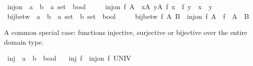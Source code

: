 \begin{isabellebody}
%
\isadelimdocument
%
\endisadelimdocument
%
\isatagdocument
%
\isamarkuptrue%
%
\endisatagdocument
{\isafolddocument}%
%
\isadelimdocument
%
\endisadelimdocument
{}\isamarkupfalse%
\ inj{\isacharunderscore}{\kern0pt}on\ {\isacharcolon}{\kern0pt}{\isacharcolon}{\kern0pt}\ {\isachardoublequoteopen}{\isacharparenleft}{\kern0pt}{\isacharprime}{\kern0pt}a\ {\isasymRightarrow}\ {\isacharprime}{\kern0pt}b{\isacharparenright}{\kern0pt}\ {\isasymRightarrow}\ {\isacharprime}{\kern0pt}a\ set\ {\isasymRightarrow}\ bool{\isachardoublequoteclose}\ \ %
\isanewline
\ \ \ {\isachardoublequoteopen}inj{\isacharunderscore}{\kern0pt}on\ f\ A\ {\isasymlongleftrightarrow}\ {\isacharparenleft}{\kern0pt}{\isasymforall}x{\isasymin}A{\isachardot}{\kern0pt}\ {\isasymforall}y{\isasymin}A{\isachardot}{\kern0pt}\ f\ x\ {\isacharequal}{\kern0pt}\ f\ y\ {\isasymlongrightarrow}\ x\ {\isacharequal}{\kern0pt}\ y{\isacharparenright}{\kern0pt}{\isachardoublequoteclose}\isanewline
\isanewline
{}\isamarkupfalse%
\ bij{\isacharunderscore}{\kern0pt}betw\ {\isacharcolon}{\kern0pt}{\isacharcolon}{\kern0pt}\ {\isachardoublequoteopen}{\isacharparenleft}{\kern0pt}{\isacharprime}{\kern0pt}a\ {\isasymRightarrow}\ {\isacharprime}{\kern0pt}b{\isacharparenright}{\kern0pt}\ {\isasymRightarrow}\ {\isacharprime}{\kern0pt}a\ set\ {\isasymRightarrow}\ {\isacharprime}{\kern0pt}b\ set\ {\isasymRightarrow}\ bool{\isachardoublequoteclose}\ \ %
\isanewline
\ \ \ {\isachardoublequoteopen}bij{\isacharunderscore}{\kern0pt}betw\ f\ A\ B\ {\isasymlongleftrightarrow}\ inj{\isacharunderscore}{\kern0pt}on\ f\ A\ {\isasymand}\ f\ {\isacharbackquote}{\kern0pt}\ A\ {\isacharequal}{\kern0pt}\ B{\isachardoublequoteclose}%
\begin{isamarkuptext}%
A common special case: functions injective, surjective or bijective over
  the entire domain type.%
\end{isamarkuptext}\isamarkuptrue%
\isamarkupfalse%
\ inj\ {\isacharcolon}{\kern0pt}{\isacharcolon}{\kern0pt}\ {\isachardoublequoteopen}{\isacharparenleft}{\kern0pt}{\isacharprime}{\kern0pt}a\ {\isasymRightarrow}\ {\isacharprime}{\kern0pt}b{\isacharparenright}{\kern0pt}\ {\isasymRightarrow}\ bool{\isachardoublequoteclose}\isanewline
\ \ \ {\isachardoublequoteopen}inj\ f\ {\isasymequiv}\ inj{\isacharunderscore}{\kern0pt}on\ f\ UNIV{\isachardoublequoteclose}\isanewline
\isanewline
{}\isamarkupfalse%

\end{isabellebody}
